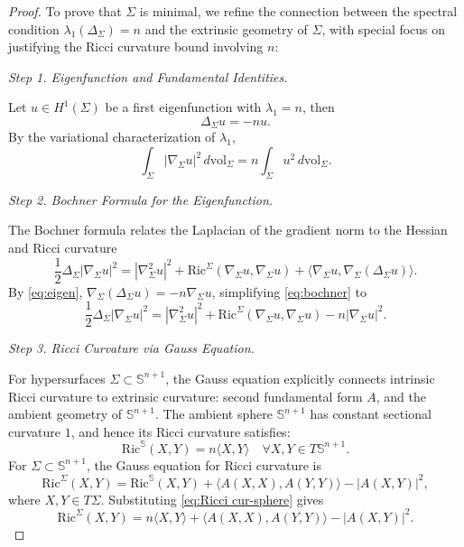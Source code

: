 \documentclass[a4, 12pt]{amsart}
\numberwithin{equation}{section} \numberwithin{equation}{section}
\begin{document}
 \begin{proof}
To prove that \(\Sigma\) is minimal, we refine the connection between the spectral condition \(\lambda_1(\Delta_\Sigma) = n\) and the extrinsic geometry of \(\Sigma\), with special focus on justifying the Ricci curvature bound involving \(n\):


\textit{Step 1. Eigenfunction and Fundamental Identities.}

Let \(u \in H^1(\Sigma)\) be a first eigenfunction with \(\lambda_1 = n\), then
\begin{equation}\label{eq:eigen}
\Delta_\Sigma u = -n u.
\end{equation}
By the variational characterization of \(\lambda_1\),
\begin{equation}\label{eq:rayleigh}
\int_\Sigma |\nabla_\Sigma u|^2 \, d\mathrm{vol}_\Sigma = n \int_\Sigma u^2 \, d\mathrm{vol}_\Sigma.
\end{equation}


\textit{Step 2. Bochner Formula for the Eigenfunction.}

The Bochner formula relates the Laplacian of the gradient norm to the Hessian and Ricci curvature
\begin{equation}\label{eq:bochner}
\frac{1}{2} \Delta_\Sigma |\nabla_\Sigma u|^2 = |\nabla^2_\Sigma u|^2 + \text{Ric}^\Sigma(\nabla_\Sigma u, \nabla_\Sigma u) + \langle \nabla_\Sigma u, \nabla_\Sigma (\Delta_\Sigma u) \rangle.
\end{equation}
By \eqref{eq:eigen}, \(\nabla_\Sigma (\Delta_\Sigma u) = -n \nabla_\Sigma u\), simplifying \eqref{eq:bochner} to
\begin{equation}\label{eq:bochner_simplified}
\frac{1}{2} \Delta_\Sigma |\nabla_\Sigma u|^2 = |\nabla^2_\Sigma u|^2 + \text{Ric}^\Sigma(\nabla_\Sigma u, \nabla_\Sigma u) - n |\nabla_\Sigma u|^2.
\end{equation}


\textit{Step 3. Ricci Curvature via Gauss Equation.}

For hypersurfaces \(\Sigma \subset \mathbb{S}^{n+1}\), the Gauss equation explicitly connects intrinsic Ricci curvature to extrinsic curvature: second fundamental form \(A\), and the ambient geometry of \(\mathbb{S}^{n+1}\). The ambient sphere \(\mathbb{S}^{n+1}\) has constant sectional curvature \(1\), and hence its Ricci curvature satisfies:
\begin{equation}\label{eq:Ricci cur-sphere}
\text{Ric}^{\mathbb{S}}(X,Y) = n \langle X,Y \rangle \quad \forall X,Y \in T\mathbb{S}^{n+1}.
\end{equation}
For \(\Sigma \subset \mathbb{S}^{n+1}\), the Gauss equation for Ricci curvature is
\begin{equation}\label{eq:gauss}
\text{Ric}^\Sigma(X,Y) = \text{Ric}^{\mathbb{S}}(X,Y) + \langle A(X,X), A(Y,Y) \rangle - |A(X,Y)|^2,
\end{equation}
where \(X,Y \in T\Sigma\). Substituting \eqref{eq:Ricci cur-sphere} gives
\begin{equation}\label{eq:gauss_simplified}
\text{Ric}^\Sigma(X,Y) = n \langle X,Y \rangle + \langle A(X,X), A(Y,Y) \rangle - |A(X,Y)|^2.
\end{equation}



\end{proof}
\end{document}
